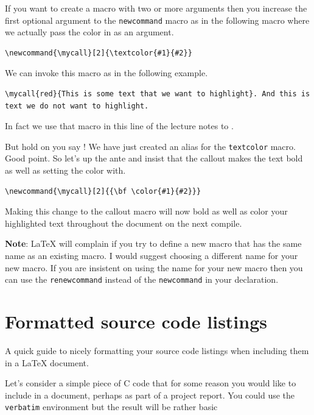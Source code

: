 If you want to create a macro with two or more arguments then you increase the first optional argument to the \texttt{newcommand} macro as in the following macro where we actually pass the color in as an argument.

\begin{verbatim}
\newcommand{\mycall}[2]{\textcolor{#1}{#2}}
\end{verbatim}

We can invoke this macro as in the following example.

\begin{verbatim}
\mycall{red}{This is some text that we want to highlight}. And this is text we do not want to highlight.
\end{verbatim}

In fact we use that macro in this line of the lecture notes to . 

But hold on you say ! We have just created an alias for the \texttt{textcolor} macro. Good point. So let's up the ante and insist that the callout makes the text bold as well as setting the color with.

\begin{verbatim}
\newcommand{\mycall}[2]{{\bf \color{#1}{#2}}}
\end{verbatim}

Making this change to the callout macro will now bold as well as color your highlighted text throughout the document on the next compile.

{\bf Note}: \LaTeX{} will complain if you try to define a new macro that has the same name as an existing macro. I would suggest choosing a different name for your new macro. If you are insistent on using the name for your new macro then you can use the \texttt{renewcommand} instead of the \texttt{newcommand} in your declaration.

\section{Formatted source code listings}

A quick guide to nicely formatting your source code listings when including them in a \LaTeX{} document.

Let's consider a simple piece of C code that for some reason you would like to include in a document, perhaps as part of a project report. You could use the \verb|verbatim| environment but the result will be rather basic

